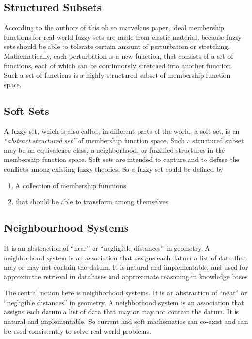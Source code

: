 \documentclass[12pt]{article} %
\begin{document}
\subsection{Structured Subsets}
According to the authors of this oh so marvelous paper, ideal membership functions for real world fuzzy sets are made from elastic material, because fuzzy sets should be able to tolerate certain
amount of perturbation or stretching. Mathematically, each perturbation is a new function, that consists of a set of functions,
each of which can be continuously stretched into
another function. Such a set of functions is a highly
structured subset of membership function space. 

\subsection{Soft Sets}
A fuzzy set, which is also called, in different parts of the world, a soft set, is an \textit{“abstract structured set”} of
membership function space. Such a structured subset
may be an equivalence class, a neighborhood, or
fuzzified structures in the membership function space. Soft sets are intended to capture and to defuse the conflicts among existing fuzzy theories. So a fuzzy set could be defined by 
\begin{enumerate}
\item{A collection of membership functions}
\item{that should be able to transform among themselves}
\end{enumerate}


\subsection{Neighbourhood Systems}
It is an abstraction of “near” or “negligible distances” in
geometry. A neighborhood system is an association that
assigns each datum a list of data that may or may not
contain the datum. It is natural and implementable, and used for  approximate retrieval in databases and approximate reasoning in knowledge bases

The central notion here is neighborhood systems. It
is an abstraction of “near” or “negligible distances” in
geometry. A neighborhood system is an association that
assigns each datum a list of data that may or may not
contain the datum. It is natural and implementable. So current and soft mathematics can
co-exist and can be used consistently to solve real
world problems.
\end{document}
